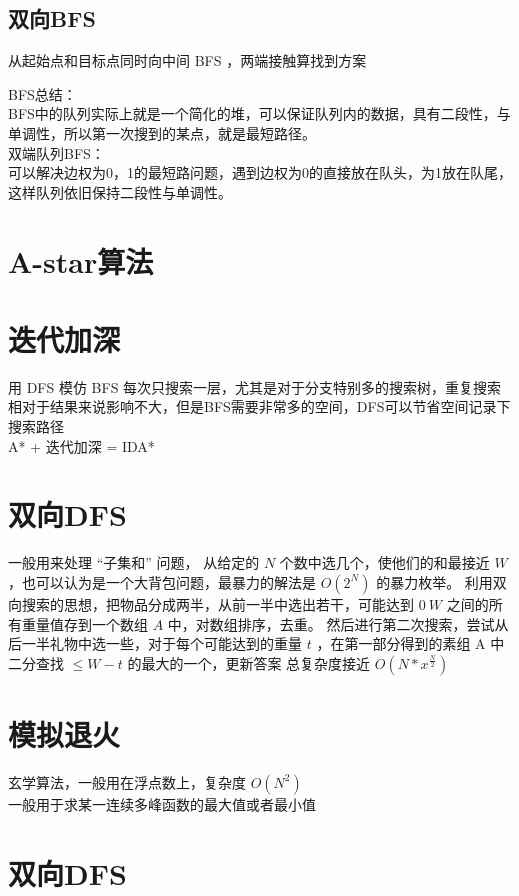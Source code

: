 \documentclass{probook}
\begin{document}
\subsection{双向BFS}
从起始点和目标点同时向中间 BFS ，两端接触算找到方案
 
BFS总结：\\
BFS中的队列实际上就是一个简化的堆，可以保证队列内的数据，具有二段性，与单调性，所以第一次搜到的某点，就是最短路径。\\
双端队列BFS：\\
可以解决边权为0，1的最短路问题，遇到边权为0的直接放在队头，为1放在队尾，这样队列依旧保持二段性与单调性。
\section{A-star算法}
 
\section{迭代加深}
用 DFS 模仿 BFS 每次只搜索一层，尤其是对于分支特别多的搜索树，重复搜索相对于结果来说影响不大，但是BFS需要非常多的空间，DFS可以节省空间记录下搜索路径 \\
A* + 迭代加深 = IDA*
 
\section{双向DFS}
一般用来处理 “子集和” 问题， 从给定的 $N$ 个数中选几个，使他们的和最接近 $W$，也可以认为是一个大背包问题，最暴力的解法是 $O(2^N)$ 的暴力枚举。
利用双向搜索的思想，把物品分成两半，从前一半中选出若干，可能达到 $0 ~ W$ 之间的所有重量值存到一个数组 $A$ 中，对数组排序，去重。
然后进行第二次搜索，尝试从后一半礼物中选一些，对于每个可能达到的重量 $t$ ，在第一部分得到的素组 A 中二分查找 $\le W - t$ 的最大的一个，更新答案
总复杂度接近 $O(N * x ^{\frac{N}{2}})$ 
 
\section{模拟退火}
玄学算法，一般用在浮点数上，复杂度 $O(N^2)$ \\
一般用于求某一连续多峰函数的最大值或者最小值
 
\section{双向DFS}
 
\end{document}
